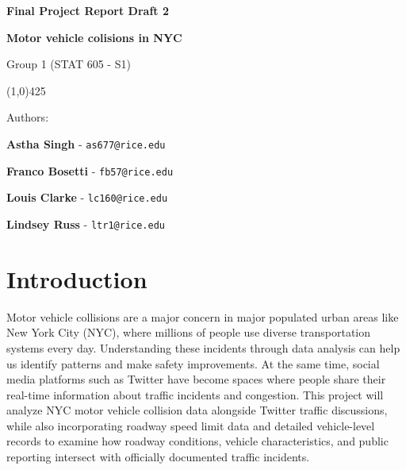 \documentclass[10pt]{article}\usepackage[]{graphicx}\usepackage[]{xcolor}
\begin{document}
\begin{titlepage}
    \centering
    
    { \Huge \textbf{Final Project Report Draft 2} \par} 
    \vspace{5mm}
    { \huge \textbf{Motor vehicle colisions in NYC} \par} 
    \vspace{3mm}
    { \Large Group 1 (STAT 605 - S1)\par}  
    
    \vspace{5mm}
    \begin{center}
    \line(1,0){425}
    \end{center}
    
    \vspace{5mm}

    \vspace{15mm}
    { \large Authors: \par }
      \vspace{3mm}
    { \Large \textbf{Astha Singh} - \texttt{as677@rice.edu} \par}
    { \Large \textbf{Franco Bosetti} - \texttt{fb57@rice.edu}\par}
    { \Large \textbf{Louis Clarke} - \texttt{lc160@rice.edu}\par}
    { \Large \textbf{Lindsey Russ} - \texttt{ltr1@rice.edu}\par}
    
    
    \vspace{5mm}
    
    \vspace{5mm}

\end{titlepage}

\newpage


\tableofcontents

\newpage

\section{Introduction}

Motor vehicle collisions are a major concern in major populated urban areas like New York City (NYC), where millions of people use diverse transportation systems every day. Understanding these incidents through data analysis can help us identify patterns and make safety improvements. At the same time, social media platforms such as Twitter have become spaces where people share their real-time information about traffic incidents and congestion. This project will analyze NYC motor vehicle collision data alongside Twitter traffic discussions, while also incorporating roadway speed limit data and detailed vehicle-level records to examine how roadway conditions, vehicle characteristics, and public reporting intersect with officially documented traffic incidents.
\end{document}
